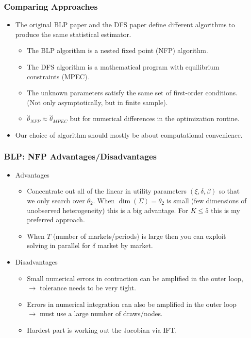\documentclass[aspectratio=169,10pt]{beamer}
\begin{document}
\begin{frame}
\frametitle{Comparing Approaches}
\begin{itemize}
\item The original BLP paper and the DFS paper define different \alert{algorithms} to produce the same statistical \alert{estimator}.
\begin{itemize}
\item The BLP algorithm is a \alert{nested fixed point} (NFP) algorithm. 
\item The DFS algorithm is a \alert{mathematical program with equilibrium constraints} (MPEC).
\item The unknown parameters satisfy the same set of first-order conditions. (Not only asymptotically, but in finite sample).
\item $\hat{\theta}_{NFP} \approx \hat{\theta}_{MPEC}$ but for numerical differences in the optimization routine.
\end{itemize}
\item Our choice of algorithm should mostly be about computational convenience.
\end{itemize}
\end{frame}

\begin{frame}
\frametitle{BLP: NFP Advantages/Disadvantages}
\begin{itemize}
\item Advantages
\begin{itemize}
\item Concentrate out all of the linear in utility parameters $(\xi,\delta,\beta)$ so that we only search over $\theta_2$. When $\dim(\Sigma)=\theta_2$ is small (few dimensions of unobserved heterogeneity) this is a big advantage. For $K \leq 5$ this is my preferred approach.
\item When $T$ (number of markets/periods) is large then you can exploit solving in parallel for $\delta$ market by market.
\end{itemize}
\item Disadvantages
\begin{itemize}
\item Small numerical errors in contraction can be amplified in the outer loop, $\rightarrow$ tolerance needs to be very tight.
\item Errors in numerical integration can also be amplified in the outer loop $\rightarrow$ must use a large number of draws/nodes.
\item Hardest part is working out the Jacobian via IFT.
\end{itemize}
\end{itemize}
\end{frame}
\end{document}
